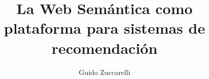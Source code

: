 \documentclass[a4paper,10pt]{report}
\title{La Web Semántica como plataforma para sistemas de recomendación}
\author{Guido Zuccarelli}
\begin{document}
\maketitle

\begin{abstract}

\end{abstract} 






















\end{document}
